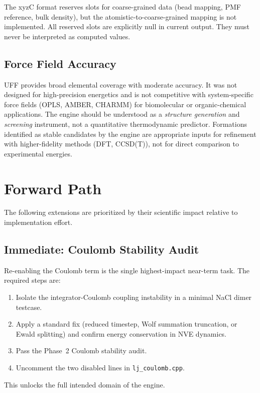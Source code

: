 \documentclass[11pt]{article}
\begin{document}
The xyzC format reserves slots for coarse-grained data
(bead mapping, PMF reference, bulk density), but the
atomistic-to-coarse-grained mapping is not implemented.
All reserved slots are explicitly null in current output.
They must never be interpreted as computed values.

\subsection{Force Field Accuracy}

UFF provides broad elemental coverage with moderate accuracy.
It was not designed for high-precision energetics and is not
competitive with system-specific force fields (OPLS, AMBER, CHARMM)
for biomolecular or organic-chemical applications.  The engine
should be understood as a \textit{structure generation} and
\textit{screening} instrument, not a quantitative thermodynamic
predictor.  Formations identified as stable candidates by the
engine are appropriate inputs for refinement with higher-fidelity
methods (DFT, CCSD(T)), not for direct comparison to experimental
energies.

\section{Forward Path}

The following extensions are prioritized by their scientific impact
relative to implementation effort.

\subsection{Immediate: Coulomb Stability Audit}

Re-enabling the Coulomb term is the single highest-impact near-term
task.  The required steps are:
\begin{enumerate}
\item Isolate the integrator-Coulomb coupling instability
      in a minimal NaCl dimer testcase.
\item Apply a standard fix (reduced timestep, Wolf summation
      truncation, or Ewald splitting) and confirm energy
      conservation in NVE dynamics.
\item Pass the Phase~2 Coulomb stability audit.
\item Uncomment the two disabled lines in \texttt{lj\_coulomb.cpp}.
\end{enumerate}
This unlocks the full intended domain of the engine.
\end{document}
